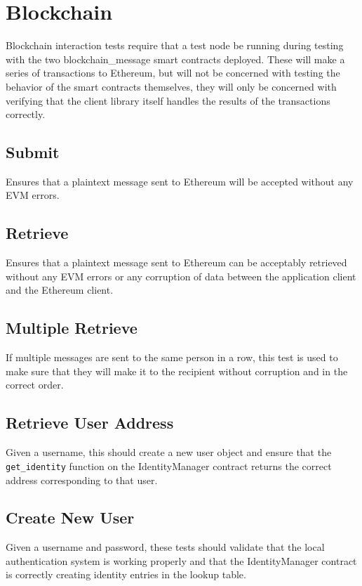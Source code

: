 \documentclass[titlepage]{report}
\begin{document}
\section{Blockchain}
Blockchain interaction tests require that a test \gls{node} be running during testing with the two blockchain\_message \glspl{smart contract} deployed. These will make a series of transactions to \gls{Ethereum}, but will not be concerned with testing the behavior of the \glspl{smart contract} themselves, they will only be concerned with verifying that the client library itself handles the results of the transactions correctly.
\subsection{Submit}
Ensures that a plaintext message sent to \gls{Ethereum} will be accepted without any EVM errors.
\subsection{Retrieve}
Ensures that a plaintext message sent to \gls{Ethereum} can be acceptably retrieved without any EVM errors or any corruption of data between the application client and the \gls{Ethereum} client.
\subsection{Multiple Retrieve}
If multiple messages are sent to the same person in a row, this test is used to make sure that they will make it to the recipient without corruption and in the correct order.
\subsection{Retrieve User Address}
Given a username, this should create a new user object and ensure that the \texttt{get\_identity} function on the IdentityManager contract returns the correct address corresponding to that user.
\subsection{Create New User}
Given a username and password, these tests should validate that the local authentication system is working properly and that the IdentityManager contract is correctly creating identity entries in the lookup table.
\end{document}
